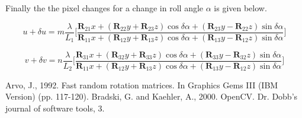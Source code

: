 \documentclass[12pt]{article}
\newcommand{\mtx}[1]{\ensuremath{\mathbf{#1}}}
\begin{document}
Finally the the pixel changes for a change in roll angle $\alpha$ is given below.

\begin{equation}\label{dualpha}
    u + \delta u = m\frac{\lambda}{L_1}
        \bigg[\frac{\mtx{R}_{21}x + (\mtx{R}_{22}y + \mtx{R}_{23}z)\cos\delta\alpha 
                   +(\mtx{R}_{23}y - \mtx{R}_{22}z)\sin\delta\alpha}
                   {\mtx{R}_{11}x + (\mtx{R}_{12}y + \mtx{R}_{13}z)\cos\delta\alpha 
                   +(\mtx{R}_{13}y - \mtx{R}_{12}z)\sin\delta\alpha}                  
        \bigg]
\end{equation}

\begin{equation}\label{dvalpha}
    v + \delta v = n\frac{\lambda}{L_2}
        \bigg[\frac{\mtx{R}_{31}x + (\mtx{R}_{32}y + \mtx{R}_{33}z)\cos\delta\alpha 
                   +(\mtx{R}_{33}y - \mtx{R}_{32}z)\sin\delta\alpha}
                   {\mtx{R}_{11}x + (\mtx{R}_{12}y + \mtx{R}_{13}z)\cos\delta\alpha 
                   +(\mtx{R}_{13}y - \mtx{R}_{12}z)\sin\delta\alpha}                  
        \bigg]
\end{equation}


\begin{thebibliography}{9}
Arvo, J., 1992. Fast random rotation matrices. In Graphics Gems III (IBM Version) (pp. 117-120).
Bradski, G. and Kaehler, A., 2000. OpenCV. Dr. Dobb’s journal of software tools, 3.
\end{thebibliography}
\end{document}
